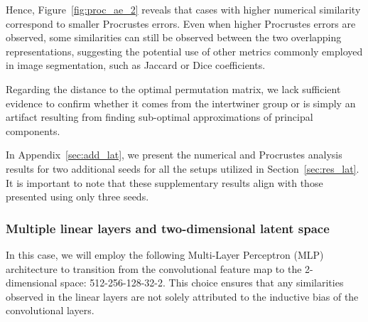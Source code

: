 \documentclass[../main.tex]{subfiles}
\begin{document}
Hence, Figure~\ref{fig:proc_ae_2} reveals that cases with higher numerical similarity correspond to smaller Procrustes errors. Even when higher Procrustes errors are observed, some similarities can still be observed between the two overlapping representations, suggesting the potential use of other metrics commonly employed in image segmentation, such as Jaccard or Dice coefficients.

Regarding the distance to the optimal permutation matrix, we lack sufficient evidence to confirm whether it comes from the intertwiner group or is simply an artifact resulting from finding sub-optimal approximations of principal components.\\

\begin{mathNote}
In Appendix~\ref{sec:add_lat}, we present the numerical and Procrustes analysis results for two additional seeds for all the setups utilized in Section~\ref{sec:res_lat}. It is important to note that these supplementary results align with those presented using only three seeds.
\end{mathNote}

\subsubsection*{Multiple linear layers and two-dimensional latent space}

In this case, we will employ the following Multi-Layer Perceptron (MLP) architecture to transition from the convolutional feature map to the 2-dimensional space: 512-256-128-32-2. This choice ensures that any similarities observed in the linear layers are not solely attributed to the inductive bias of the convolutional layers.\\
\end{document}
